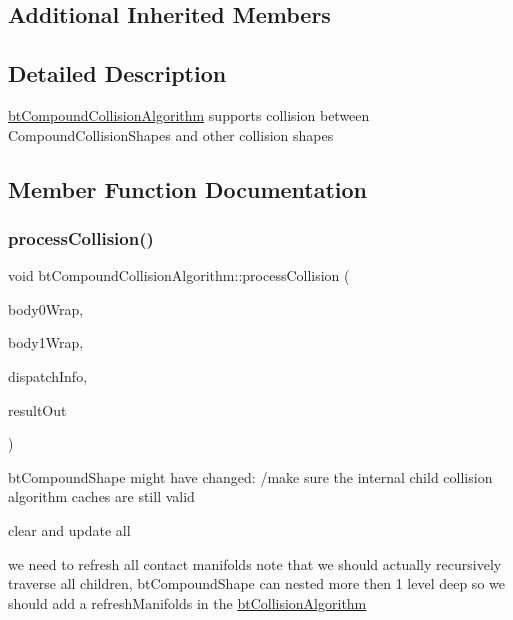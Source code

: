 \subsection*{Additional Inherited Members}


\subsection{Detailed Description}
\hyperlink{classbtCompoundCollisionAlgorithm}{bt\+Compound\+Collision\+Algorithm} supports collision between Compound\+Collision\+Shapes and other collision shapes 

\subsection{Member Function Documentation}
\mbox{\label{classbtCompoundCollisionAlgorithm_a173ce993461795e0572dd2924c54cdc0}} 
\subsubsection{\texorpdfstring{process\+Collision()}{processCollision()}}
{\footnotesize\ttfamily void bt\+Compound\+Collision\+Algorithm\+::process\+Collision (\begin{DoxyParamCaption}\item[{const \hyperlink{structbtCollisionObjectWrapper}{bt\+Collision\+Object\+Wrapper} $\ast$}]{body0\+Wrap,  }\item[{const \hyperlink{structbtCollisionObjectWrapper}{bt\+Collision\+Object\+Wrapper} $\ast$}]{body1\+Wrap,  }\item[{const \hyperlink{structbtDispatcherInfo}{bt\+Dispatcher\+Info} \&}]{dispatch\+Info,  }\item[{\hyperlink{classbtManifoldResult}{bt\+Manifold\+Result} $\ast$}]{result\+Out }\end{DoxyParamCaption})\hspace{0.3cm}{\ttfamily [virtual]}}

bt\+Compound\+Shape might have changed\+: /make sure the internal child collision algorithm caches are still valid

clear and update all

we need to refresh all contact manifolds note that we should actually recursively traverse all children, bt\+Compound\+Shape can nested more then 1 level deep so we should add a \textquotesingle{}refresh\+Manifolds\textquotesingle{} in the \hyperlink{classbtCollisionAlgorithm}{bt\+Collision\+Algorithm} 

